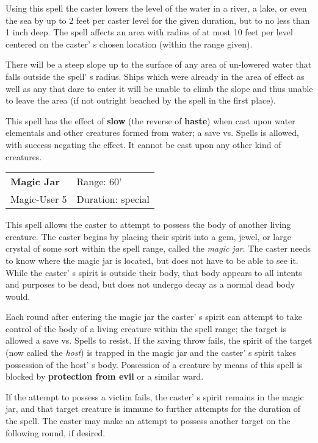 \documentclass[a4paper,twoside,openany,10pt]{book}
\begin{document}
\begin{multicols}{2}
Using this spell the caster lowers the level of the water in a river, a lake, or even the sea by up to 2 feet per caster level for the given duration, but to no less than 1 inch deep. The spell affects an area with radius of at most 10 feet per level centered on the caster' s chosen location (within the range given).

There will be a steep slope up to the surface of any area of un-lowered water that falls outside the spell' s radius. Ships which were already in the area of effect as well as any that dare to enter it will be unable to climb the slope and thus unable to leave the area (if not outright beached by the spell in the first place).

This spell has the effect of \textbf{slow} (the reverse of \textbf{haste}) when cast upon water elementals and other creatures formed from water; a save vs. Spells is allowed, with success negating the effect. It cannot be cast upon any other kind of creatures.


\smallskip\begin{flushleft} 
	\begin{tabularx}{0.45\textwidth}{@{}m{3.5cm}m{5.5cm}@{}} 
		\textbf{Magic Jar} & Range: 60'\\
Magic-User 5 &Duration: special\\
	\end{tabularx}\end{flushleft}

This spell allows the caster to attempt to possess the body of another living creature. The caster begins by placing their spirit into a gem, jewel, or large crystal of some sort within the spell range, called the \emph{magic jar}. The caster needs to know where the magic jar is located, but does not have to be able to see it. While the caster' s spirit is outside their body, that body appears to all intents and purposes to be dead, but does not undergo decay as a normal dead body would.

Each round after entering the magic jar the caster' s spirit can attempt to take control of the body of a living creature within the spell range; the target is allowed a save vs. Spells to resist. If the saving throw fails, the spirit of the target (now called the \emph{host}) is trapped in the magic jar and the caster' s spirit takes possession of the host' s body. Possession of a creature by means of this spell is blocked by \textbf{protection from evil }or a similar ward. 

If the attempt to possess a victim fails, the caster' s spirit remains in the magic jar, and that target creature is immune to further attempts for the duration of the spell. The caster may make an attempt to possess another target on the following round, if desired.


\end{multicols}
\end{document}
